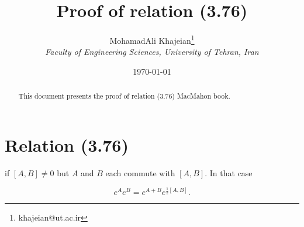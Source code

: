 \documentclass[12pt]{article}
\title{\textbf{Proof of relation (3.76)}}
\author{
    MohamadAli Khajeian\footnote{khajeian@ut.ac.ir} \\ 
    \small \textit{Faculty of Engineering Sciences, University of Tehran, Iran} \\ 
}
\date{\today}
\begin{document}
\maketitle

\begin{abstract}
    This document presents the proof of relation (3.76) MacMahon book.
\end{abstract}


\section*{Relation (3.76)}

if $[A,B] \neq 0$ but $A$ and $B$ each commute with $[A,B]$. In that case

\begin{equation}
    \label{1}
    e^Ae^B=e^{A+B}e^{\frac{1}{2}[A,B]}.
\end{equation}
\end{document}
